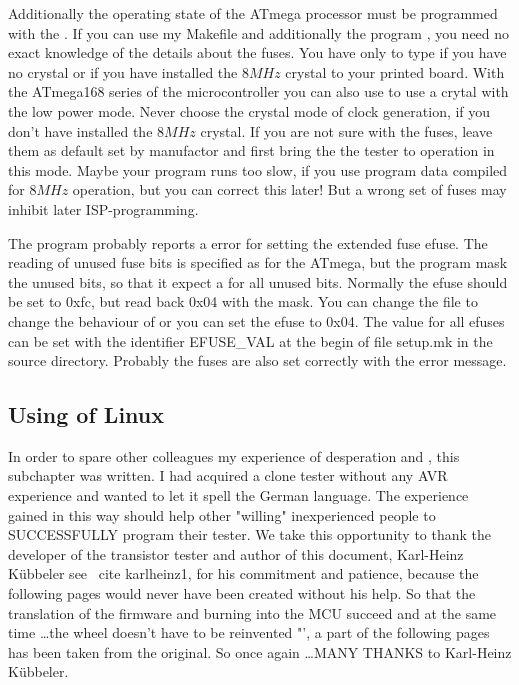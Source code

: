 Additionally the operating state of the
ATmega processor must be programmed with the .
If you can use my Makefile and additionally the program  \cite{avrdude}, you need no exact
knowledge of the details about the fuses. You have only to type  if you
have no crystal or  if you have installed the \(8MHz\) crystal to your printed board.
With the ATmega168 series of the microcontroller you can also use  to use
a crytal with the low power mode.
Never choose the crystal mode of clock generation, if you don't have installed
the \(8MHz\) crystal. If you are not sure with the fuses, leave them as default
set by manufactor and first bring the the tester to operation in this mode.
Maybe your program runs too slow, if you use program data compiled for
\(8MHz\) operation, but you can correct this later! But a wrong set of fuses may inhibit
later ISP-programming.

The program  probably reports a error for setting the extended fuse efuse.
The reading of unused fuse bits is specified as  for the ATmega, but the
 program mask the unused bits, so that it expect a  for all unused bits.
Normally the efuse should be set to 0xfc, but  read back 0x04 with the mask.
You can change the file  to change the behaviour of  or
you can set the efuse to 0x04. 
The value for all efuses can be set with the identifier EFUSE\_VAL at the begin of file setup.mk
in the source directory.
Probably the fuses are also set correctly with the error message.
\vspace{-0,3 cm}
\subsection{Using of Linux}
In order to spare other colleagues my experience of desperation and ,
this subchapter was written.
I had acquired a clone tester without any AVR experience and wanted to let it spell the
German language. 
The experience gained in this way should help other "willing" inexperienced people to
SUCCESSFULLY program their tester. 
We take this opportunity to thank the developer of the transistor tester and author of this document, Karl-Heinz Kübbeler see \ cite {karlheinz1}, for his commitment and patience,
because the following pages would never have been created without his help. 
So that the translation of the firmware and burning into the MCU succeed and at the same
time \dots the wheel doesn't have to be reinvented "',
a part of the following pages has been taken from the original. 
So once again \dots \LARGE {MANY THANKS}
\normalsize to Karl-Heinz Kübbeler. 

